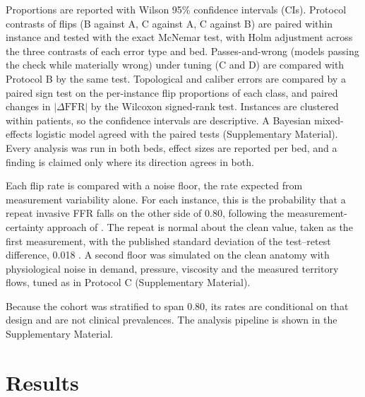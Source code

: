 \documentclass[journal,twoside,web]{ieeecolor}
\begin{document}
Proportions are reported with Wilson 95\% confidence intervals (CIs). Protocol contrasts of flips (B against A, C against A, C against B) are paired within instance and tested with the exact McNemar test, with Holm adjustment across the three contrasts of each error type and bed. Passes-and-wrong (models passing the check while materially wrong) under tuning (C and D) are compared with Protocol B by the same test. Topological and caliber errors are compared by a paired sign test on
the per-instance flip proportions of each class, and paired changes in $|\Delta\mathrm{FFR}|$ by the Wilcoxon
signed-rank test. Instances are clustered within patients, so the confidence intervals are descriptive. A Bayesian mixed-effects logistic model agreed with the paired tests (Supplementary Material). Every analysis was run in both beds, effect sizes are reported per bed, and a finding is
claimed only where its direction agrees in both.

Each flip rate is compared with a noise floor, the rate expected from measurement variability alone. For each instance, this is the probability that a repeat invasive FFR falls on the other side of 0.80, following the measurement-certainty approach of \cite{petraco2013}. The repeat is normal about the clean value, taken as the first measurement, with the published standard deviation of the test--retest difference, 0.018 \cite{johnson2015}. A second floor was simulated on the clean anatomy with physiological
noise in demand, pressure, viscosity and the measured territory flows, tuned as in Protocol C (Supplementary Material).

Because the cohort was stratified to span 0.80, its rates are conditional
on that design and are not clinical prevalences. The analysis pipeline is shown in the Supplementary Material.

\section{Results}
\end{document}
